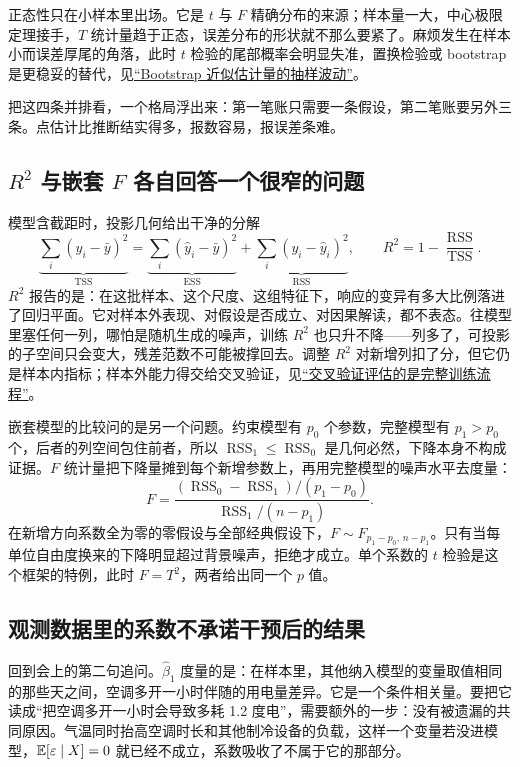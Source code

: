 正态性只在小样本里出场。它是 \(t\) 与 \(F\) 精确分布的来源；样本量一大，中心极限定理接手，\(T\) 统计量趋于正态，误差分布的形状就不那么要紧了。麻烦发生在样本小而误差厚尾的角落，此时 \(t\) 检验的尾部概率会明显失准，置换检验或 bootstrap 是更稳妥的替代，见\hyperref[sec:11-Mathematical-Statistics/06-Resampling-and-Model-Selection/01]{``Bootstrap 近似估计量的抽样波动''}。

把这四条并排看，一个格局浮出来：第一笔账只需要一条假设，第二笔账要另外三条。点估计比推断结实得多，报数容易，报误差条难。

\subsection{\(R^2\) 与嵌套 \(F\) 各自回答一个很窄的问题}

模型含截距时，投影几何给出干净的分解
\[
\underbrace{\sum_i (y_i - \bar y)^2}_{\operatorname{TSS}}
= \underbrace{\sum_i (\widehat y_i - \bar y)^2}_{\operatorname{ESS}}
+ \underbrace{\sum_i (y_i - \widehat y_i)^2}_{\operatorname{RSS}},
\qquad
R^2 = 1 - \frac{\operatorname{RSS}}{\operatorname{TSS}} .
\]
\(R^2\) 报告的是：在这批样本、这个尺度、这组特征下，响应的变异有多大比例落进了回归平面。它对样本外表现、对假设是否成立、对因果解读，都不表态。往模型里塞任何一列，哪怕是随机生成的噪声，训练 \(R^2\) 也只升不降——列多了，可投影的子空间只会变大，残差范数不可能被撑回去。调整 \(R^2\) 对新增列扣了分，但它仍是样本内指标；样本外能力得交给交叉验证，见\hyperref[sec:11-Mathematical-Statistics/06-Resampling-and-Model-Selection/03]{``交叉验证评估的是完整训练流程''}。

嵌套模型的比较问的是另一个问题。约束模型有 \(p_0\) 个参数，完整模型有 \(p_1 > p_0\) 个，后者的列空间包住前者，所以 \(\operatorname{RSS}_1 \le \operatorname{RSS}_0\) 是几何必然，下降本身不构成证据。\(F\) 统计量把下降量摊到每个新增参数上，再用完整模型的噪声水平去度量：
\[
F = \frac{(\operatorname{RSS}_0 - \operatorname{RSS}_1)/(p_1 - p_0)}{\operatorname{RSS}_1/(n - p_1)} .
\]
在新增方向系数全为零的零假设与全部经典假设下，\(F \sim F_{p_1-p_0,\,n-p_1}\)。只有当每单位自由度换来的下降明显超过背景噪声，拒绝才成立。单个系数的 \(t\) 检验是这个框架的特例，此时 \(F = T^2\)，两者给出同一个 \(p\) 值。

\subsection{观测数据里的系数不承诺干预后的结果}

回到会上的第二句追问。\(\widehat\beta_1\) 度量的是：在样本里，其他纳入模型的变量取值相同的那些天之间，空调多开一小时伴随的用电量差异。它是一个条件相关量。要把它读成``把空调多开一小时会导致多耗 1.2 度电''，需要额外的一步：没有被遗漏的共同原因。气温同时抬高空调时长和其他制冷设备的负载，这样一个变量若没进模型，\(\mathbb{E}[\varepsilon\mid X]=0\) 就已经不成立，系数吸收了不属于它的那部分。

